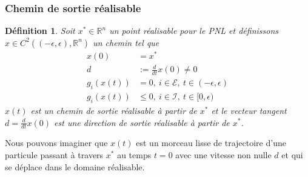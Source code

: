 \documentclass[usepdftitle=false]{beamer}
\newtheorem{defn}{Définition}
\def\red{\color{red}}
\def\cE{\mathcal{E}}
\def\cI{\mathcal{I}}
\def\RR{\mathbb{R}}
\begin{document}
\begin{frame}
	\frametitle{Chemin de sortie réalisable}
	
	\begin{defn}
		Soit $x^* \in \RR^n$ un point réalisable pour le PNL et définissons $x \in C^2\left((-\epsilon,\epsilon), \RR^n \right)$ un chemin tel que
		\begin{align*}
		x(0) &= x^* \\
		d &:= \frac{d}{dt}x(0) \ne 0 \\
		g_i(x(t)) &= 0,\ i \in \cE,\ t \in (-\epsilon, \epsilon) \\
		g_i(x(t)) &\leq 0,\ i \in \cI,\ t \in [0, \epsilon)
		\end{align*}
		$x(t)$ est {\red un chemin de sortie réalisable} à partir de $x^*$ et le vecteur tangent $d = \frac{d}{dt}x(0)$ est {\red une direction de sortie réalisable} à partir de $x^*$.
	\end{defn}
	
	Nous pouvons imaginer que $x(t)$ est un morceau lisse de trajectoire d'une particule passant à travers $x^*$ au temps $t = 0$ avec une vitesse non nulle $d$ et qui se déplace dans le domaine réalisable.
	
\end{frame}
\end{document}
